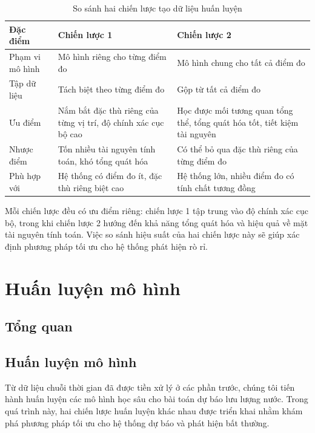 \begin{table}[h]
    \centering
    \begin{tabular}{|p{4cm}|p{5cm}|p{5cm}|}
        \hline
        \textbf{Đặc điểm} & \textbf{Chiến lược 1} & \textbf{Chiến lược 2} \\
        \hline
        Phạm vi mô hình & Mô hình riêng cho từng điểm đo & Mô hình chung cho tất cả điểm đo \\
        \hline
        Tập dữ liệu & Tách biệt theo từng điểm đo & Gộp từ tất cả điểm đo \\
        \hline
        Ưu điểm & Nắm bắt đặc thù riêng của từng vị trí, độ chính xác cục bộ cao & Học được mối tương quan tổng thể, tổng quát hóa tốt, tiết kiệm tài nguyên \\
        \hline
        Nhược điểm & Tốn nhiều tài nguyên tính toán, khó tổng quát hóa & Có thể bỏ qua đặc thù riêng của từng điểm đo \\
        \hline
        Phù hợp với & Hệ thống có điểm đo ít, đặc thù riêng biệt cao & Hệ thống lớn, nhiều điểm đo có tính chất tương đồng \\
        \hline
    \end{tabular}
    \caption{So sánh hai chiến lược tạo dữ liệu huấn luyện}
    \label{tab:training_strategy_comparison}
\end{table}

Mỗi chiến lược đều có ưu điểm riêng: chiến lược 1 tập trung vào độ chính xác cục bộ, trong khi chiến lược 2 hướng đến khả năng tổng quát hóa và hiệu quả về mặt tài nguyên tính toán. Việc so sánh hiệu suất của hai chiến lược này sẽ giúp xác định phương pháp tối ưu cho hệ thống phát hiện rò rỉ.


\section{Huấn luyện mô hình}
\subsection{Tổng quan}
\subsection{Huấn luyện mô hình}

Từ dữ liệu chuỗi thời gian đã được tiền xử lý ở các phần trước, chúng tôi tiến hành huấn luyện các mô hình học sâu cho bài toán dự báo lưu lượng nước. Trong quá trình này, hai chiến lược huấn luyện khác nhau được triển khai nhằm khám phá phương pháp tối ưu cho hệ thống dự báo và phát hiện bất thường.


